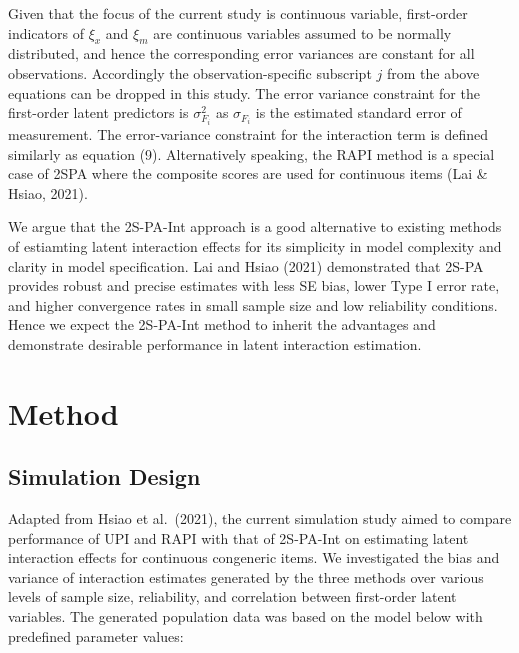 \documentclass[
  man]{apa6}
\begin{document}
Given that the focus of the current study is continuous variable, first-order indicators of \(\xi_{x}\) and \(\xi_{m}\) are continuous variables assumed to be normally distributed, and hence the corresponding error variances are constant for all observations. Accordingly the observation-specific subscript \(j\) from the above equations can be dropped in this study. The error variance constraint for the first-order latent predictors is \(\sigma_{F_{i}}^2\) as \(\sigma_{F_{i}}\) is the estimated standard error of measurement. The error-variance constraint for the interaction term is defined similarly as equation (9). Alternatively speaking, the RAPI method is a special case of 2SPA where the composite scores are used for continuous items (Lai \& Hsiao, 2021).

We argue that the 2S-PA-Int approach is a good alternative to existing methods of estiamting latent interaction effects for its simplicity in model complexity and clarity in model specification. Lai and Hsiao (2021) demonstrated that 2S-PA provides robust and precise estimates with less SE bias, lower Type I error rate, and higher convergence rates in small sample size and low reliability conditions. Hence we expect the 2S-PA-Int method to inherit the advantages and demonstrate desirable performance in latent interaction estimation.

\hypertarget{method}{%
\section{Method}\label{method}}

\hypertarget{simulation-design}{%
\subsection{Simulation Design}\label{simulation-design}}

Adapted from Hsiao et al.~(2021), the current simulation study aimed to compare performance of UPI and RAPI with that of 2S-PA-Int on estimating latent interaction effects for continuous congeneric items. We investigated the bias and variance of interaction estimates generated by the three methods over various levels of sample size, reliability, and correlation between first-order latent variables. The generated population data was based on the model below with predefined parameter values:
\end{document}

